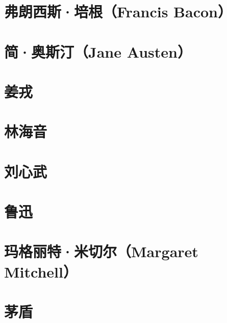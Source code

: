 \documentclass[12pt,utf8]{book}
\begin{document}
% 

\chapter{弗朗西斯·培根（Francis Bacon）}


% 


\chapter{简·奥斯汀（Jane Austen）}

% 


\chapter{姜戎}


% 

\chapter{林海音}

% 

\chapter{刘心武}

% 

\chapter{鲁迅}



\chapter{玛格丽特·米切尔（Margaret Mitchell）}

% 

\chapter{茅盾}

% 
\end{document}
